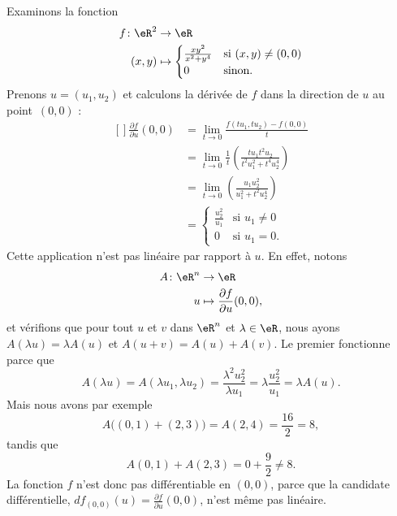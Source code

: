 \begin{example}     \label{Exemple0046Diff}
Examinons la fonction
\begin{equation}
    \begin{aligned}
        f\colon \eR^2&\to \eR \\
        (x,y)&\mapsto \begin{cases}
    \frac{ xy^2 }{ x^2+y^4 }    &   \text{si }(x,y)\neq (0,0)\\
    0   &    \text{sinon}.
\end{cases}
    \end{aligned}
\end{equation}
Prenons $u=(u_1,u_2)$ et calculons la dérivée de $f$ dans la direction de $u$ au point~$(0,0)$ :
\begin{equation}
    \begin{aligned}[]
        \frac{ \partial f }{ \partial u }(0,0)  
            &=\lim_{t\to 0}\frac{ f(tu_1,tu_2)-f(0,0) }{ t }\\
            &=\lim_{t\to 0}\frac{1}{ t }\left( \frac{ tu_1t^2u_2 }{ t^2u_1^2+t^4u_2^4 } \right)\\
            &=\lim_{t\to 0}\left( \frac{ u_1u_2^2 }{ u_1^2+t^2u_2^4 } \right)\\
            &=\begin{cases}
    \frac{ u_2^2 }{ u_1 }   &   \text{si }u_1\neq 0\\
    0   &    \text{si }u_1=0.
\end{cases}
    \end{aligned}
\end{equation}
Cette application n'est pas linéaire par rapport à $u$. En effet, notons
\begin{equation}
    \begin{aligned}
        A\colon \eR^n&\to \eR \\
        u&\mapsto \frac{ \partial f }{ \partial u }(0,0), 
    \end{aligned}
\end{equation}
et vérifions que pour tout $u$ et $v$ dans $\eR^n$ et $\lambda\in\eR$, nous ayons $A(\lambda u)=\lambda A(u)$ et $A(u+v)=A(u)+A(v)$. Le premier fonctionne parce que
\begin{equation}
    A(\lambda u)=A(\lambda u_1,\lambda u_2)=\frac{ \lambda^2 u_2^2 }{ \lambda u_1 }=\lambda\frac{ u_2^2 }{ u_1 }=\lambda A(u).
\end{equation}
Mais nous avons par exemple
\begin{equation}
    A\big( (0,1)+(2,3) \big)=A(2,4)=\frac{ 16 }{ 2 }=8,
\end{equation}
tandis que
\begin{equation}
    A(0,1)+A(2,3)=0+\frac{ 9 }{ 2 }\neq 8.
\end{equation}
La fonction $f$ n'est donc pas différentiable en $(0,0)$, parce que la candidate différentielle, $df_{(0,0)}(u)=\frac{ \partial f }{ \partial u }(0,0)$, n'est même pas linéaire.

\end{example}

